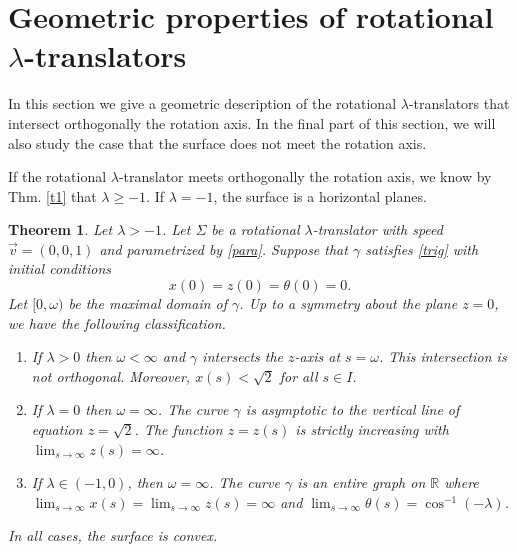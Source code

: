 \documentclass[12pt]{amsart}
\def\r{\mathbb R}
\newtheorem{theorem}{Theorem}[section]
\theoremstyle{definition}
\begin{document}
\section{Geometric properties of rotational $\lambda$-translators}\label{s4}

In this section we give a geometric description of the rotational $\lambda$-translators  that intersect orthogonally the rotation axis. In the final part of this section, we will also study the case that the surface does not meet the rotation axis. 

If the rotational $\lambda$-translator  meets orthogonally the rotation axis, we know by  Thm. \ref{t1} that  $\lambda\geq -1$. If $\lambda=-1$, the surface is a horizontal planes.  

 \begin{theorem}\label{t2}
Let $\lambda>-1$. Let $\Sigma$ be a rotational $\lambda$-translator with speed    $\vec{v}=(0,0,1)$ and parametrized by \eqref{para}. Suppose that $\gamma$ satisfies \eqref{trig} with initial conditions
\begin{equation}\label{trig2}
x(0)=z(0)=\theta(0)=0.
\end{equation}
Let   $[0,\omega)$ be the maximal domain of $\gamma$.  Up to a symmetry about the plane $z=0$, we have the following classification.
\begin{enumerate}
\item If $\lambda>0$  then $\omega<\infty$ and $\gamma$  intersects   the $z$-axis at $s=\omega$. This intersection is not orthogonal. Moreover,  $x(s)<\sqrt{2}$ for all $s\in I$.
\item If $\lambda=0$ then $\omega=\infty$. The curve $\gamma$ is asymptotic to the vertical line of equation $z=\sqrt{2}$. The function $z=z(s)$  is strictly increasing with $\lim_{s\to\infty}z(s)=\infty$.
\item If $\lambda\in (-1,0)$, then $\omega=\infty$. The curve $\gamma$ is an entire graph on $\r$ where $\lim_{s\to\infty}x(s)=\lim_{s\to\infty}z(s)=\infty$ and $\lim_{s\to\infty}\theta(s)=\cos^{-1}(-\lambda)$.   
 \end{enumerate}
In all cases, the surface is convex.
\end{theorem}
\end{document}
